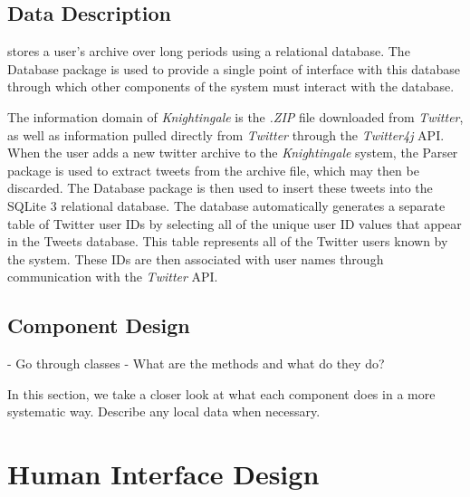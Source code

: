 \documentclass[a4paper, 12pt]{article}
\begin{document}
\subsection{Data Description} \label{sec:datadescript}
\begin{adjustwidth}{2em}{0pt}
 stores a user's  archive over long periods using a  relational database. The Database package is used to provide a single point of interface with this database through which other components of the system must interact with the database.\newline

The information domain of \textit{Knightingale} is the \textit{.ZIP} file downloaded from \textit{Twitter}, as well as information pulled directly from \textit{Twitter} through the \textit{Twitter4j} API. When the user adds a new twitter archive to the \textit{Knightingale} system, the Parser package is used to extract tweets from the archive file, which may then be discarded. The Database package is then used to insert these tweets into the SQLite 3 relational database. The database automatically generates a separate table of Twitter user IDs by selecting all of the unique user ID values that appear in the Tweets database. This table represents all of the Twitter users known by the system. These IDs are then associated with  user names through communication with the \textit{Twitter} API.
\end{adjustwidth}

\subsection{Component Design} \label{sec:component}
\begin{adjustwidth}{1em}{0pt}
- Go through classes
- What are the methods and what do they do?

In this section, we take a closer look at what each component does in a more systematic way. 
Describe any local data when necessary.
\end{adjustwidth}

\section{Human Interface Design} \label{sec:human}
\end{document}
